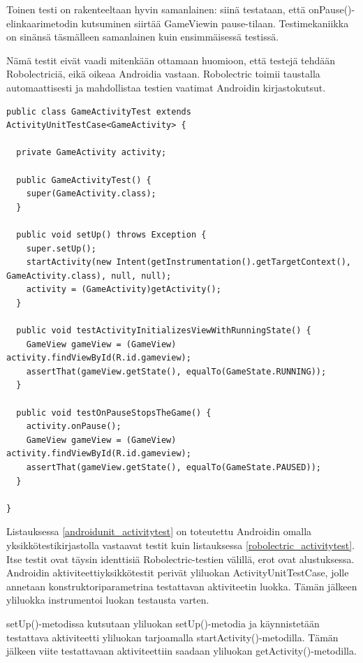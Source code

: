 Toinen testi on rakenteeltaan hyvin samanlainen: siinä testataan, että onPause()-elinkaarimetodin kutsuminen siirtää GameViewin pause-tilaan. Testimekaniikka on sinänsä täsmälleen samanlainen kuin ensimmäisessä testissä.

Nämä testit eivät vaadi mitenkään ottamaan huomioon, että testejä tehdään Robolectriciä, eikä oikeaa Androidia vastaan. Robolectric toimii taustalla automaattisesti ja mahdollistaa testien vaatimat Androidin kirjastokutsut.

\begin{lstlisting}[float,label=androidunit_activitytest,caption=Yksinkertainen aktiviteettiyksikkötesti ActivityUnitTestCasen avulla]
public class GameActivityTest extends ActivityUnitTestCase<GameActivity> {

  private GameActivity activity;

  public GameActivityTest() {
  	super(GameActivity.class);
  }

  public void setUp() throws Exception {
  	super.setUp();
  	startActivity(new Intent(getInstrumentation().getTargetContext(), GameActivity.class), null, null);
    activity = (GameActivity)getActivity();
  }

  public void testActivityInitializesViewWithRunningState() {
    GameView gameView = (GameView) activity.findViewById(R.id.gameview);
    assertThat(gameView.getState(), equalTo(GameState.RUNNING));
  }
  
  public void testOnPauseStopsTheGame() {
  	activity.onPause();
  	GameView gameView = (GameView) activity.findViewById(R.id.gameview);
  	assertThat(gameView.getState(), equalTo(GameState.PAUSED));
  }
  
}
\end{lstlisting}

Listauksessa \ref{androidunit_activitytest} on toteutettu Androidin omalla yksikkötestikirjastolla vastaavat testit kuin listauksessa \ref{robolectric_activitytest}. Itse testit ovat täysin identtisiä Robolectric-testien välillä, erot ovat alustuksessa. Androidin aktiviteettiyksikkötestit perivät yliluokan ActivityUnitTestCase, jolle annetaan konstruktoriparametrina testattavan aktiviteetin luokka. Tämän jälkeen yliluokka instrumentoi luokan testausta varten.

setUp()-metodissa kutsutaan yliluokan setUp()-metodia ja käynnistetään testattava aktiviteetti yliluokan tarjoamalla startActivity()-metodilla. Tämän jälkeen viite testattavaan aktiviteettiin saadaan yliluokan getActivity()-metodilla.

